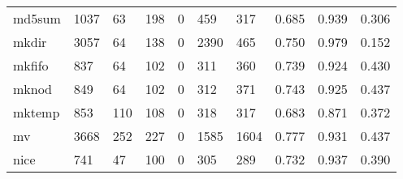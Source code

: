 \begin{longtable}{lp{2.0cm}p{2.0cm}p{2.0cm}p{2.0cm}p{2.0cm}p{2.0cm}p{2.0cm}p{2.0cm}p{2.0cm}}
md5sum    &                   1037 &                                 63 &                               198 &                                0 &                               459 &                             317 &                                0.685 &                                  0.939 &                                0.306 \\
mkdir     &                   3057 &                                 64 &                               138 &                                0 &                              2390 &                             465 &                                0.750 &                                  0.979 &                                0.152 \\
mkfifo    &                    837 &                                 64 &                               102 &                                0 &                               311 &                             360 &                                0.739 &                                  0.924 &                                0.430 \\
mknod     &                    849 &                                 64 &                               102 &                                0 &                               312 &                             371 &                                0.743 &                                  0.925 &                                0.437 \\
mktemp    &                    853 &                                110 &                               108 &                                0 &                               318 &                             317 &                                0.683 &                                  0.871 &                                0.372 \\
mv        &                   3668 &                                252 &                               227 &                                0 &                              1585 &                            1604 &                                0.777 &                                  0.931 &                                0.437 \\
nice      &                    741 &                                 47 &                               100 &                                0 &                               305 &                             289 &                                0.732 &                                  0.937 &                                0.390 \\

\end{longtable}
